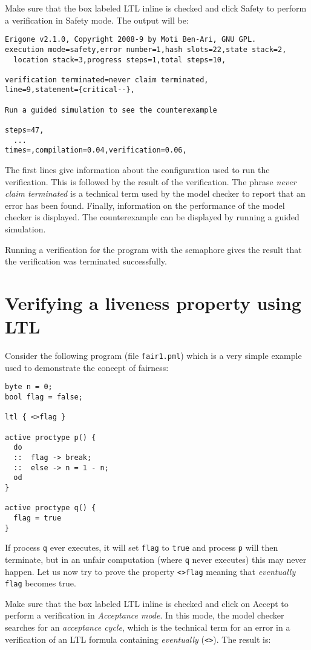 \documentclass[11pt]{article}
\newcommand*{\p}[1]{\texttt{#1}}
\newcommand*{\bu}[1]{\textsf{#1}}
\begin{document}
Make sure that the box labeled \bu{LTL inline} is checked and click
\bu{Safety} to perform a verification in Safety mode. The output will
be:

\begin{verbatim}
Erigone v2.1.0, Copyright 2008-9 by Moti Ben-Ari, GNU GPL.
execution mode=safety,error number=1,hash slots=22,state stack=2,
  location stack=3,progress steps=1,total steps=10,

verification terminated=never claim terminated,
line=9,statement={critical--},

Run a guided simulation to see the counterexample

steps=47,
  ...
times=,compilation=0.04,verification=0.06,
\end{verbatim}

The first lines give information about the configuration used to run the
verification. This is followed by the result of the verification. The
phrase \emph{never claim terminated} is a technical term used by the
model checker to report that an error has been found. Finally,
information on the performance of the model checker is displayed. The
counterexample can be displayed by running a guided simulation.

Running a verification for the program with the semaphore gives the
result that the verification was terminated successfully.

\section{Verifying a liveness property using LTL}

Consider the following program (file \p{fair1.pml}) which is a very
simple example used to demonstrate the concept of fairness:
\begin{verbatim}
byte n = 0;
bool flag = false;

ltl { <>flag }

active proctype p() {
  do
  ::  flag -> break;
  ::  else -> n = 1 - n;
  od
}

active proctype q() {
  flag = true
}
\end{verbatim}

If process \p{q} ever executes, it will set \p{flag} to \p{true} and
process \p{p} will then terminate, but in an unfair computation (where
\p{q} never executes) this may never happen. Let us now try to prove the
property \p{<>flag} meaning that \emph{eventually} \p{flag} becomes
true. 

Make sure that the box labeled \bu{LTL inline} is checked and click
on \bu{Accept} to perform a verification in \emph{Acceptance
mode}. In this mode, the model checker searches for an \emph{acceptance
cycle}, which is the technical term for an error in a verification of an
LTL formula containing \emph{eventually} (\p{<>}). The result is:
\end{document}
